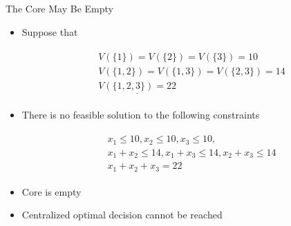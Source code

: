 \documentclass[14pt]{beamer}
\begin{document}
\begin{frame}{The Core May Be Empty}
\begin{itemize}
\small
\justifying

	\item Suppose that

\vspace{-1.5em}
  \begin{eqnarray*}
    \begin{aligned}
  &V(\{1\}) = V(\{2\}) = V(\{3\}) = 10 \\
  &V(\{1,2\}) = V(\{1,3\}) = V(\{2,3\}) = 14 \\
  &\underline{V(\{1,2,3\}) = 22}
    \end{aligned}
  \end{eqnarray*}
\vspace{-1.5em}

  \item There is no feasible solution to the following constraints

  \vspace{-1.5em}
    \begin{eqnarray*}
      \begin{aligned}
    &x_1 \leq 10, x_2 \leq 10, x_3 \leq 10,   \\
    &x_1 + x_2 \leq 14, x_1 + x_3 \leq 14, x_2 + x_3 \leq 14\\
    &x_1 + x_2 + x_3  = 22
      \end{aligned}
    \end{eqnarray*}
  \vspace{-1.5em}

  \item  Core is empty
  \item  Centralized optimal decision cannot be reached

\end{itemize}
\end{frame}
\end{document}
